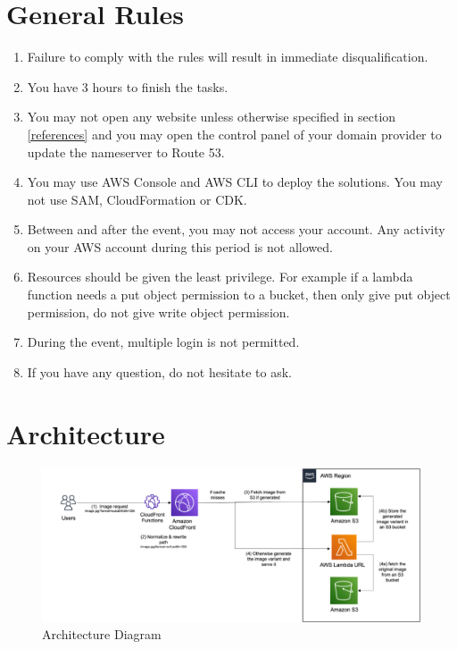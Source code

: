\documentclass{article}
\begin{document}
\section{General Rules}
\begin{enumerate}
    \item Failure to comply with the rules will result in immediate disqualification.
    \item You have 3 hours to finish the tasks.
    \item You may not open any website unless otherwise specified in section \ref{references} and you may open the control panel of your domain provider to update the nameserver to Route 53.
    \item You may use AWS Console and AWS CLI to deploy the solutions. You may not use SAM, CloudFormation or CDK.
    \item Between and after the event, you may not access your account. Any activity on your AWS account during this period is not allowed.
    \item Resources should be given the least privilege. For example if a lambda function needs a put object permission to a bucket, then only give put object permission, do not give write object permission.
    \item During the event, multiple login is not permitted.
    \item If you have any question, do not hesitate to ask.
\end{enumerate}
\section{Architecture}\label{architecture}
\begin{figure}[h]
\centering
\includegraphics[width=\textwidth]{architecture.png}
\caption{\label{fig:architecture}Architecture Diagram}
\end{figure}
\end{document}
